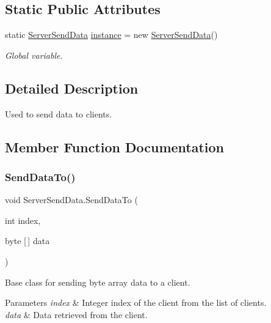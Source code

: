 \subsection*{Static Public Attributes}
\begin{DoxyCompactItemize}
\item 
static \mbox{\hyperlink{class_server_send_data}{Server\+Send\+Data}} \mbox{\hyperlink{class_server_send_data_a6857a6a98dddeec22456fe8a362c7c30}{instance}} = new \mbox{\hyperlink{class_server_send_data}{Server\+Send\+Data}}()
\begin{DoxyCompactList}\small\item\em Global variable. \end{DoxyCompactList}\end{DoxyCompactItemize}


\subsection{Detailed Description}
Used to send data to clients. 



\subsection{Member Function Documentation}
\mbox{\label{class_server_send_data_a7fb6d84bdffbfca0424dd92841988a9c}} 
\subsubsection{\texorpdfstring{SendDataTo()}{SendDataTo()}}
{\footnotesize\ttfamily void Server\+Send\+Data.\+Send\+Data\+To (\begin{DoxyParamCaption}\item[{int}]{index,  }\item[{byte \mbox{[}$\,$\mbox{]}}]{data }\end{DoxyParamCaption})}



Base class for sending byte array data to a client. 


\begin{DoxyParams}{Parameters}
{\em index} & Integer index of the client from the list of clients.\\
\hline
{\em data} & Data retrieved from the client.\\
\hline
\end{DoxyParams}
\mbox{\label{class_server_send_data_ae281214f153a330d64faa820ff55c3b7}} 
